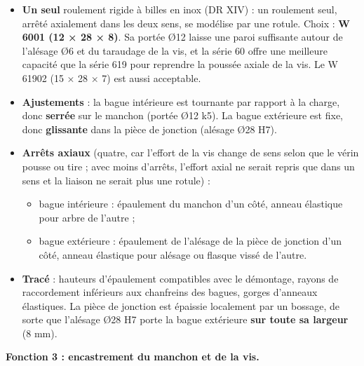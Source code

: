 \documentclass[11pt,a4paper]{article}
\providecommand{\tightlist}{\setlength{\itemsep}{0pt}\setlength{\parskip}{0pt}}
\begin{document}
\begin{itemize}
\tightlist
\item
  \textbf{Un seul} roulement rigide à billes en inox (DR XIV) : un roulement seul, arrêté axialement dans les deux sens, se modélise par une rotule. Choix : \textbf{W 6001 (12 × 28 × 8)}. Sa portée Ø12 laisse une paroi suffisante autour de l'alésage Ø6 et du taraudage de la vis, et la série 60 offre une meilleure capacité que la série 619 pour reprendre la poussée axiale de la vis. Le W 61902 (15 × 28 × 7) est aussi acceptable.
\item
  \textbf{Ajustements} : la bague intérieure est tournante par rapport à la charge, donc \textbf{serrée} sur le manchon (portée Ø12 k5). La bague extérieure est fixe, donc \textbf{glissante} dans la pièce de jonction (alésage Ø28 H7).
\item
  \textbf{Arrêts axiaux} (quatre, car l'effort de la vis change de sens selon que le vérin pousse ou tire ; avec moins d'arrêts, l'effort axial ne serait repris que dans un sens et la liaison ne serait plus une rotule) :

  \begin{itemize}
  \tightlist
  \item
    bague intérieure : épaulement du manchon d'un côté, anneau élastique pour arbre de l'autre ;
  \item
    bague extérieure : épaulement de l'alésage de la pièce de jonction d'un côté, anneau élastique pour alésage ou flasque vissé de l'autre.
  \end{itemize}
\item
  \textbf{Tracé} : hauteurs d'épaulement compatibles avec le démontage, rayons de raccordement inférieurs aux chanfreins des bagues, gorges d'anneaux élastiques. La pièce de jonction est épaissie localement par un bossage, de sorte que l'alésage Ø28 H7 porte la bague extérieure \textbf{sur toute sa largeur} (8 mm).
\end{itemize}

\textbf{Fonction 3 : encastrement du manchon et de la vis.}
\end{document}
